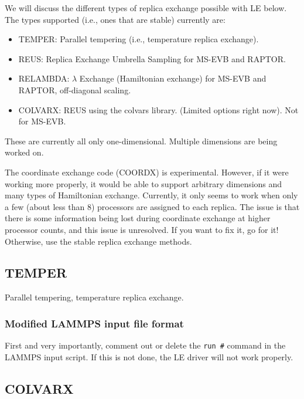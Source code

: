 \documentclass[10pt]{article}
\begin{document}
We will discuss the different types of replica exchange possible with LE below.
The types supported (i.e., ones that are stable) currently are:
\begin{itemize}
	\item TEMPER: 	Parallel tempering (i.e., temperature replica exchange).
	\item REUS:		Replica Exchange Umbrella Sampling for MS-EVB and RAPTOR.
	\item RELAMBDA:	$\lambda$ Exchange (Hamiltonian exchange) for MS-EVB and RAPTOR, off-diagonal scaling.
	\item COLVARX:	REUS using the colvars library. (Limited options right now). Not for MS-EVB.
\end{itemize}
These are currently all only one-dimensional. Multiple dimensions are being worked on.

The coordinate exchange code (COORDX) is experimental. However, if it were working more properly,
it would be able to support arbitrary dimensions and many types of Hamiltonian exchange. Currently,
it only seems to work when only a few (about less than 8) processors are assigned to each replica.
The issue is that there is some information being lost during coordinate exchange at higher processor
counts, and this issue is unresolved. If you want to fix it, go for it! Otherwise, use the stable
replica exchange methods.

\subsection{TEMPER}

Parallel tempering, temperature replica exchange.

\subsubsection{Modified LAMMPS input file format}

First and very importantly, comment out
or delete the \texttt{run \#} command in the LAMMPS input script. If this is not done,
the LE driver will not work properly. 


\subsection{COLVARX}
\end{document}
